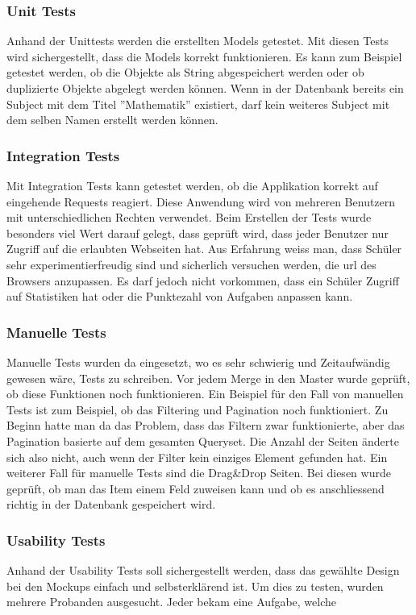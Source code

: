 \subsubsection*{Unit Tests}
Anhand der Unittests werden die erstellten Models getestet. Mit diesen Tests wird sichergestellt, dass die Models korrekt funktionieren. Es kann zum Beispiel getestet werden, ob die Objekte als String abgespeichert werden oder ob duplizierte Objekte abgelegt werden können. Wenn in der Datenbank bereits ein Subject mit dem Titel ''Mathematik'' existiert, darf kein weiteres Subject mit dem selben Namen erstellt werden können.


\subsubsection*{Integration Tests}
Mit Integration Tests kann getestet werden, ob die Applikation korrekt auf eingehende Requests reagiert. Diese Anwendung wird von mehreren Benutzern mit unterschiedlichen Rechten verwendet. Beim Erstellen der Tests wurde besonders viel Wert darauf gelegt, dass geprüft wird, dass jeder Benutzer nur Zugriff auf die erlaubten Webseiten hat. Aus Erfahrung weiss man, dass Schüler sehr experimentierfreudig sind und sicherlich versuchen werden, die \gls{url} des Browsers anzupassen. Es darf jedoch nicht vorkommen, dass ein Schüler Zugriff auf Statistiken hat oder die Punktezahl von Aufgaben anpassen kann.


\subsubsection*{Manuelle Tests}
Manuelle Tests wurden da eingesetzt, wo es sehr schwierig und Zeitaufwändig gewesen wäre, Tests zu schreiben. Vor jedem Merge in den Master wurde geprüft, ob diese Funktionen noch funktionieren. Ein Beispiel für den Fall von manuellen Tests ist zum Beispiel, ob das Filtering und Pagination noch funktioniert. Zu Beginn hatte man da das Problem, dass das Filtern zwar funktionierte, aber das Pagination basierte auf dem gesamten Queryset. Die Anzahl der Seiten änderte sich also nicht, auch wenn der Filter kein einziges Element gefunden hat. Ein weiterer Fall für manuelle Tests sind die Drag\&Drop Seiten. Bei diesen wurde geprüft, ob man das Item einem Feld zuweisen kann und ob es anschliessend richtig in der Datenbank gespeichert wird. \\

\subsubsection*{Usability Tests}
Anhand der Usability Tests soll sichergestellt werden, dass das gewählte Design bei den Mockups einfach und selbsterklärend ist. Um dies zu testen, wurden mehrere Probanden ausgesucht. Jeder bekam eine Aufgabe, welche

